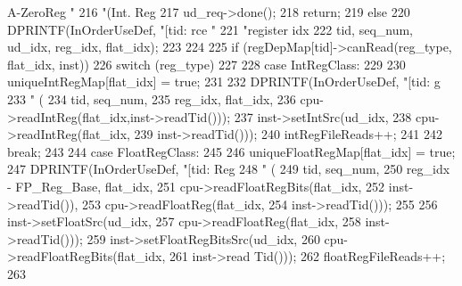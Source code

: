 \begin{DoxyCode}
{{{{      A-ZeroReg "
216                         "(Int. Reg %
217                 ud_req->done();
218                 return;
219             } else {
220                 DPRINTF(InOrderUseDef, "[tid:%
      rce "
221                         "register idx %
222                         tid, seq_num, ud_idx, reg_idx, flat_idx);
223             }
224 
225             if (regDepMap[tid]->canRead(reg_type, flat_idx, inst)) {
226                 switch (reg_type)
227                 {
228                   case IntRegClass:
229                     {
230                         uniqueIntRegMap[flat_idx] = true;
231 
232                         DPRINTF(InOrderUseDef, "[tid:%
      g %
233                                 " (%
234                                 tid, seq_num,
235                                 reg_idx, flat_idx,
236                                 cpu->readIntReg(flat_idx,inst->readTid()));
237                         inst->setIntSrc(ud_idx,
238                                         cpu->readIntReg(flat_idx,
239                                                         inst->readTid()));
240                         intRegFileReads++;
241                     }
242                     break;
243 
244                   case FloatRegClass:
245                     {
246                         uniqueFloatRegMap[flat_idx] = true;
247                         DPRINTF(InOrderUseDef, "[tid:%
      Reg %
248                                 " (%
249                                 tid, seq_num,
250                                 reg_idx - FP_Reg_Base, flat_idx,
251                                 cpu->readFloatRegBits(flat_idx,
252                                                       inst->readTid()),
253                                 cpu->readFloatReg(flat_idx,
254                                                   inst->readTid()));
255 
256                         inst->setFloatSrc(ud_idx,
257                                           cpu->readFloatReg(flat_idx,
258                                                             inst->readTid()));
259                         inst->setFloatRegBitsSrc(ud_idx,
260                                                  cpu->readFloatRegBits(flat_idx,
261                                                                        inst->read
      Tid()));
262                         floatRegFileReads++;
263                     }
}}}}}
\end{DoxyCode}
